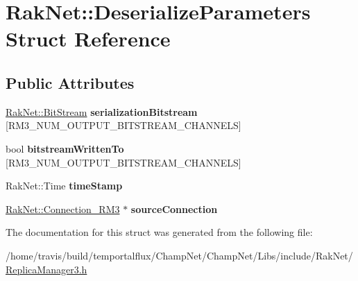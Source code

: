 \hypertarget{struct_rak_net_1_1_deserialize_parameters}{\section{Rak\-Net\-:\-:Deserialize\-Parameters Struct Reference}
\label{struct_rak_net_1_1_deserialize_parameters}
}
\subsection*{Public Attributes}
\begin{DoxyCompactItemize}
\item 
\hypertarget{struct_rak_net_1_1_deserialize_parameters_a8557ee9e6d1adfa83043b6a8329b03fb}{\hyperlink{class_rak_net_1_1_bit_stream}{Rak\-Net\-::\-Bit\-Stream} {\bfseries serialization\-Bitstream} \mbox{[}R\-M3\-\_\-\-N\-U\-M\-\_\-\-O\-U\-T\-P\-U\-T\-\_\-\-B\-I\-T\-S\-T\-R\-E\-A\-M\-\_\-\-C\-H\-A\-N\-N\-E\-L\-S\mbox{]}}\label{struct_rak_net_1_1_deserialize_parameters_a8557ee9e6d1adfa83043b6a8329b03fb}

\item 
\hypertarget{struct_rak_net_1_1_deserialize_parameters_a27b075cddaa4c938c719f793e1625b8b}{bool {\bfseries bitstream\-Written\-To} \mbox{[}R\-M3\-\_\-\-N\-U\-M\-\_\-\-O\-U\-T\-P\-U\-T\-\_\-\-B\-I\-T\-S\-T\-R\-E\-A\-M\-\_\-\-C\-H\-A\-N\-N\-E\-L\-S\mbox{]}}\label{struct_rak_net_1_1_deserialize_parameters_a27b075cddaa4c938c719f793e1625b8b}

\item 
\hypertarget{struct_rak_net_1_1_deserialize_parameters_a5c41de746136e9bc19dd02536c1f4116}{Rak\-Net\-::\-Time {\bfseries time\-Stamp}}\label{struct_rak_net_1_1_deserialize_parameters_a5c41de746136e9bc19dd02536c1f4116}

\item 
\hypertarget{struct_rak_net_1_1_deserialize_parameters_a694de449dce6f9a5485196387857eb0d}{\hyperlink{class_rak_net_1_1_connection___r_m3}{Rak\-Net\-::\-Connection\-\_\-\-R\-M3} $\ast$ {\bfseries source\-Connection}}\label{struct_rak_net_1_1_deserialize_parameters_a694de449dce6f9a5485196387857eb0d}

\end{DoxyCompactItemize}


The documentation for this struct was generated from the following file\-:\begin{DoxyCompactItemize}
\item 
/home/travis/build/temportalflux/\-Champ\-Net/\-Champ\-Net/\-Libs/include/\-Rak\-Net/\hyperlink{_replica_manager3_8h}{Replica\-Manager3.\-h}\end{DoxyCompactItemize}
